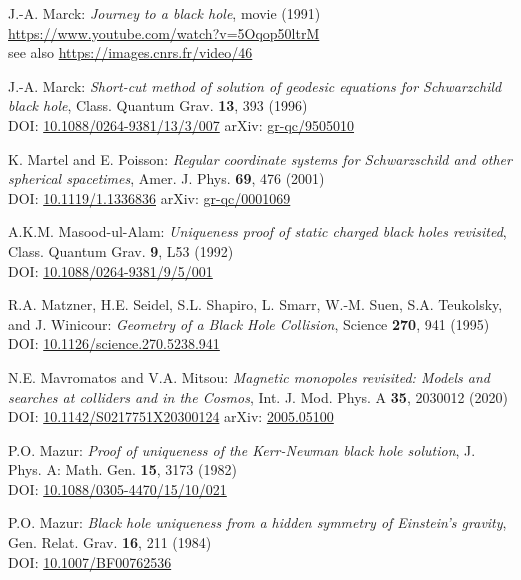 \begin{thebibliography}{123}
J.-A. Marck:
{\em Journey to a black hole}, movie (1991)\\
\url{https://www.youtube.com/watch?v=5Oqop50ltrM}\\
see also \url{https://images.cnrs.fr/video/46}

J.-A. Marck:
{\em Short-cut method of solution of geodesic equations for Schwarzchild black hole},
Class. Quantum Grav. {\bf 13}, 393 (1996)\\
DOI: \href{https://doi.org/10.1088/0264-9381/13/3/007}{10.1088/0264-9381/13/3/007}\hfill
arXiv: \href{https://arxiv.org/abs/gr-qc/9505010}{gr-qc/9505010}

K. Martel and E. Poisson:
{\em Regular coordinate systems for Schwarzschild and other spherical spacetimes},
Amer. J. Phys. {\bf 69}, 476 (2001)\\
DOI: \href{https://doi.org/10.1119/1.1336836}{10.1119/1.1336836}\hfill
arXiv: \href{https://arxiv.org/abs/gr-qc/0001069}{gr-qc/0001069}

A.K.M. Masood-ul-Alam:
{\em Uniqueness proof of static charged black holes revisited},
Class. Quantum Grav. {\bf 9}, L53 (1992)\\
DOI: \href{https://doi.org/10.1088/0264-9381/9/5/001}{10.1088/0264-9381/9/5/001}

R.A. Matzner, H.E. Seidel, S.L. Shapiro, L. Smarr, W.-M. Suen, S.A. Teukolsky, and
J. Winicour: {\em Geometry of a Black Hole Collision},
Science {\bf 270}, 941 (1995)\\
DOI: \href{https://doi.org/10.1126/science.270.5238.941}{10.1126/science.270.5238.941}

N.E. Mavromatos and V.A. Mitsou:
{\em Magnetic monopoles revisited: Models and searches at colliders and in the Cosmos},
Int. J. Mod. Phys. A {\bf 35}, 2030012 (2020)\\
DOI: \href{https://doi.org/10.1142/S0217751X20300124}{10.1142/S0217751X20300124}\hfill
arXiv: \href{https://arxiv.org/abs/2005.05100}{2005.05100}

P.O. Mazur:
{\em Proof of uniqueness of the Kerr-Newman black hole solution},
J. Phys. A: Math. Gen. {\bf 15}, 3173 (1982)\\
DOI: \href{https://doi.org/10.1088/0305-4470/15/10/021}{10.1088/0305-4470/15/10/021}

P.O. Mazur:
{\em Black hole uniqueness from a hidden symmetry of Einstein's gravity},
Gen. Relat. Grav. {\bf 16}, 211 (1984)\\
DOI: \href{https://doi.org/10.1007/BF00762536}{10.1007/BF00762536}


\end{thebibliography}
